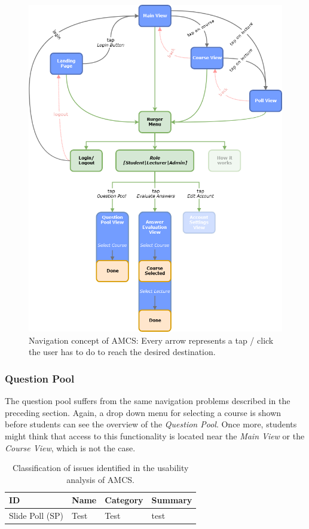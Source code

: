 \begin{figure}[ht]
	\centering
	\includegraphics[width=\textwidth]{diagrams/amcs-click-paths.png}
	\caption{Navigation concept of AMCS: Every arrow represents a tap / click the user has to do to reach the desired destination.}
	\label{figure:clickpathproblems}
\end{figure}
\subsubsection{Question Pool}

The question pool suffers from the same navigation problems described in the preceding section. Again, a drop down menu for selecting a course is shown before students can see the overview of the \emph{Question Pool}. Once more, students might think that access to this functionality is located near the \emph{Main View} or the \emph{Course View}, which is not the case.



\begin{table}[t]
	{\renewcommand{\arraystretch}{2}
		\begin{tabular}{ | p{1cm} | p{2.5cm} |  p{2.5cm} |  p{6cm} |}
			\hline
			ID & Name & Category & Summary \\ \hline \hline
			Slide Poll (SP) & Test & Test & test \\ \hline
		\end{tabular}
	}
	\caption{Classification of issues identified in the usability analysis of AMCS.}
	\label{tab:problems}
\end{table}

